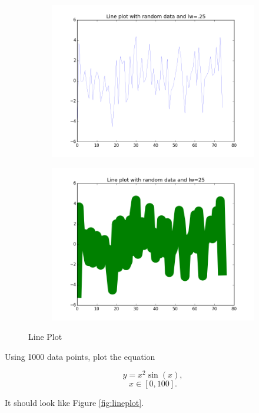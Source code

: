 \begin{figure}
\centering
\begin{subfigure}{.45\textwidth}
\centering
\includegraphics[width=\textwidth]{line_plot_bad_thin.png}
\end{subfigure}
\begin{subfigure}{.45\textwidth}
\centering
\includegraphics[width=\textwidth]{line_plot_bad_thick.png}
\end{subfigure}
\caption{Line Plot}
\label{fig:lineplot_bad}
\end{figure}


\begin{problem}
Using 1000 data points, plot the equation

$$y = x^2\sin(x),$$
$$x \in [0,100].$$


It should look like Figure \ref{fig:lineplot}.
\end{problem}

